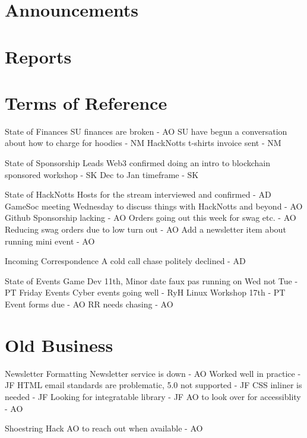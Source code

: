 \documentclass[11pt,hacksoc]{meetingmins}
\begin{document}
\maketitle

\section{Announcements}

\section{Reports}


\section{Terms of Reference}
\begin{items}
\item {State of Finances}
\subitem SU finances are broken - AO
\subitem SU have begun a conversation about how to charge for hoodies - NM
\subitem HackNotts t-shirts invoice sent - NM
\item {State of Sponsorship Leads}
\subitem Web3 confirmed doing an intro to blockchain sponsored workshop - SK
\subsubitem Dec to Jan timeframe - SK
\item {State of HackNotts}
\subitem Hosts for the stream interviewed and confirmed - AD
\subitem GameSoc meeting Wednesday to discuss things with HackNotts and beyond - AO
\subitem Github Sponsorship lacking - AO
\subitem Orders going out this week for swag etc. - AO
\subitem Reducing swag orders due to low turn out - AO
\subitem Add a newsletter item about running mini event - AO
\item {Incoming Correspondence}
\subitem A cold call chase politely declined - AD
\item {State of Events}
\subitem Game Dev 11th, Minor date faux pas running on Wed not Tue - PT
\subitem Friday Events Cyber events going well - RyH
\subitem Linux Workshop 17th - PT
\subitem Event forms due - AO
\subitem RR needs chasing - AO
\end{items}

\section{Old Business}
\begin{items}
\item Newsletter Formatting
\subitem Newsletter service is down - AO
\subitem Worked well in practice - JF
\subitem HTML email standards are problematic, 5.0 not supported - JF
\subitem CSS inliner is needed - JF
\subsubitem Looking for integratable library - JF
\subitem AO to look over for accessiblity - AO
\item Shoestring Hack
\subitem AO to reach out when available - AO
\end{items}
\end{document}
